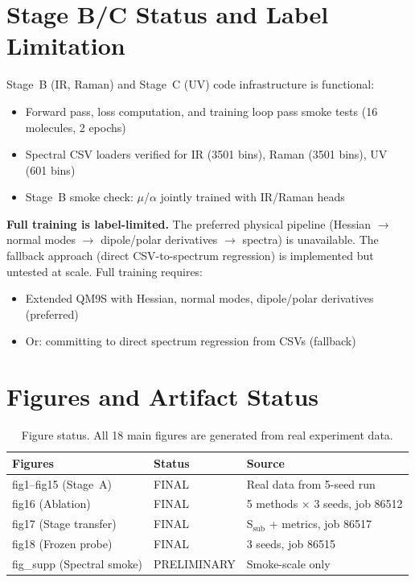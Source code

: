 \documentclass[11pt,a4paper]{article}
\begin{document}
\section{Stage B/C Status and Label Limitation}

Stage~B (IR, Raman) and Stage~C (UV) code infrastructure is functional:
\begin{itemize}[nosep]
    \item Forward pass, loss computation, and training loop pass smoke tests (16 molecules, 2 epochs)
    \item Spectral CSV loaders verified for IR (3501 bins), Raman (3501 bins), UV (601 bins)
    \item Stage~B smoke check: $\mu$/$\alpha$ jointly trained with IR/Raman heads
\end{itemize}

\textbf{Full training is label-limited.} The preferred physical pipeline (Hessian $\to$ normal modes $\to$ dipole/polar derivatives $\to$ spectra) is unavailable. The fallback approach (direct CSV-to-spectrum regression) is implemented but untested at scale. Full training requires:
\begin{itemize}[nosep]
    \item Extended QM9S with Hessian, normal modes, dipole/polar derivatives (preferred)
    \item Or: committing to direct spectrum regression from CSVs (fallback)
\end{itemize}

\section{Figures and Artifact Status}

\begin{table}[ht]
\centering
\begin{tabular}{lll}
\toprule
\textbf{Figures} & \textbf{Status} & \textbf{Source} \\
\midrule
fig1--fig15 (Stage~A) & FINAL & Real data from 5-seed run \\
fig16 (Ablation)      & FINAL & 5 methods $\times$ 3 seeds, job 86512 \\
fig17 (Stage transfer) & FINAL & S$_\text{sub}$ + metrics, job 86517 \\
fig18 (Frozen probe)  & FINAL & 3 seeds, job 86515 \\
fig\_supp (Spectral smoke) & PRELIMINARY & Smoke-scale only \\
\bottomrule
\end{tabular}
\caption{Figure status. All 18 main figures are generated from real experiment data.}
\end{table}
\end{document}
